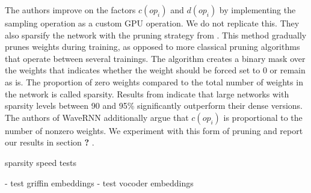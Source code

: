 \documentclass[a4paper, oneside, 12pt, english]{article}
\newcommand{\rw}{\color{red}\textbf{?} \color{black}}		%
\begin{document}
The authors improve on the factors $c(op_i)$ and $d(op_i)$ by implementing the sampling operation as a custom GPU operation. We do not replicate this. They also sparsify the network with the pruning strategy from \citep{SparsityRNN, 2PruneOrNot2Prune}. This method gradually prunes weights during training, as opposed to more classical pruning algorithms that operate between several trainings. The algorithm creates a binary mask over the weights that indicates whether the weight should be forced set to 0 or remain as is. The proportion of zero weights compared to the total number of weights in the network is called sparsity. Results from \citep{SparsityRNN, 2PruneOrNot2Prune} indicate that large networks with sparsity levels between 90 and 95\% significantly outperform their dense versions. The authors of WaveRNN additionally argue that $c(op_i)$ is proportional to the number of nonzero weights. We experiment with this form of pruning and report our results in section \rw.





\color{red} sparsity speed tests \color{black}

%

- test griffin embeddings
- test vocoder embeddings

\clearpage

 























\end{document}
